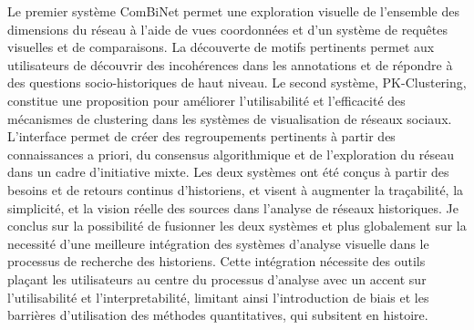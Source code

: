 {Le premier système ComBiNet permet une exploration visuelle de l'ensemble des dimensions du réseau à l'aide de vues coordonnées et d'un système de requêtes visuelles et de comparaisons.
La découverte de motifs pertinents permet aux utilisateurs de découvrir des incohérences dans les annotations et de répondre à des questions socio-historiques de haut niveau.
Le second système, PK-Clustering, constitue une proposition pour améliorer l'utilisabilité et l'efficacité des mécanismes de clustering dans les systèmes de visualisation de réseaux sociaux.
L'interface permet de créer des regroupements pertinents à partir des connaissances a priori, du consensus algorithmique et de l'exploration du réseau dans un cadre d'initiative mixte.
Les deux systèmes ont été conçus à partir des besoins et de retours continus d'historiens, et visent à augmenter la traçabilité, la simplicité, et la vision réelle des sources dans l'analyse de réseaux historiques.
Je conclus sur la possibilité de fusionner les deux systèmes et plus globalement sur la necessité d'une meilleure intégration des systèmes d'analyse visuelle dans le processus de recherche des historiens.
Cette intégration nécessite des outils plaçant les utilisateurs au centre du processus d'analyse avec un accent sur l'utilisabilité et l'interpretabilité, limitant ainsi l'introduction de biais et les barrières d'utilisation des méthodes quantitatives, qui subsitent en histoire.}




